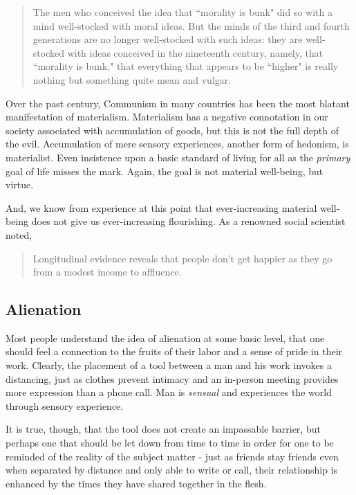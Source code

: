 \documentclass[letterpaper]{article}
\begin{document}
\begin{quote}
  The men who conceived the idea that ``morality is bunk" did so with a mind well-stocked with moral ideas. But the minds of the third and fourth generations are no longer well-stocked with such ideas: they are well-stocked with ideas conceived in the nineteenth century, namely, that ``morality is bunk," that everything that appears to be ``higher" is really nothing but something quite mean and vulgar.
\end{quote}

Over the past century, Communism in many countries has been the most blatant manifestation of materialism. Materialism has a negative connotation in our society associated with accumulation of goods, but this is not the full depth of the evil. Accumulation of mere sensory experiences, another form of hedonism, is materialist. Even insistence upon a basic standard of living for all as the \textit{primary} goal of life misses the mark. Again, the goal is not material well-being, but virtue.

And, we know from experience at this point that ever-increasing material well-being does not give us ever-increasing flourishing. As a renowned social scientist noted,

\begin{quote}
  Longitudinal evidence reveals that people don't get happier as they go from a modest income to affluence.
\end{quote}

\subsection{Alienation}

Most people understand the idea of alienation at some basic level, that one should feel a connection to the fruits of their labor and a sense of pride in their work. Clearly, the placement of a tool between a man and his work invokes a distancing, just as clothes prevent intimacy and an in-person meeting provides more expression than a phone call. Man is \textit{sensual} and experiences the world through sensory experience.

It is true, though, that the tool does not create an impassable barrier, but perhaps one that should be let down from time to time in order for one to be reminded of the reality of the subject matter - just as friends stay friends even when separated by distance and only able to write or call, their relationship is enhanced by the times they have shared together in the flesh.
\end{document}
